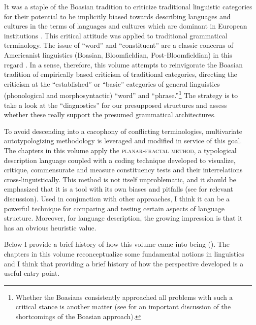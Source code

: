 \documentclass[output=paper,hidelinks]{langscibook}
\begin{document}
It was a staple of the Boasian tradition to criticize traditional linguistic categories for their potential to be implicitly biased towards describing languages and cultures in the terms of languages and cultures which are dominant in European institutions \citep{stockingjr.1974introduction, rodseth2022reality}. This critical attitude was applied to traditional grammatical terminology. The issue of ``word'' and ``constituent'' are a classic concerns of Americanist linguistics (Boasian, Bloomfieldian, Post-Bloomfieldian) in this regard \citep{boas1911introduction, bloomfield1914sentence, hockett1947morphology, pike1972problem}. In a sense, therefore, this volume attempts to reinvigorate the Boasian tradition of empirically based criticism of traditional categories, directing the criticism at the ``established'' or ``basic'' categories of general linguistics (phonological and morphosyntactic) ``word'' and ``phrase.''\footnote{Whether the Boasians consistently approached all problems with such a critical stance is another matter (see \citealt{anderson2019boas} for an important discussion of the shortcomings of the Boasian approach).} The strategy is to take a look at the ``diagnostics'' for our presupposed structures and assess whether these really support the presumed grammatical architectures.

To avoid descending into a cacophony of conflicting terminologies, multivariate autotypologizing methodology \citep{bickel2002autotypologizing} is leveraged and modified in service of this goal. The chapters in this volume apply the \textsc{planar-fractal method}, a typological description language coupled with a coding technique developed to visualize, critique, commensurate and measure constituency tests and their interrelations cross-linguistically. This method is not itself unproblematic, and it should be emphasized that it is a tool with its own biases and pitfalls (see \citealt{wimsatt2007re} for relevant discussion). Used in conjunction with other approaches, I think it can be a powerful technique for comparing and testing certain aspects of language structure. Moreover, for language description, the growing impression is that it has an obvious heuristic value.

Below I provide a brief history of how this volume came into being (). The chapters in this volume reconceptualize some fundamental notions in linguistics and I think that providing a brief history of how the perspective developed is a useful entry point.
\end{document}

